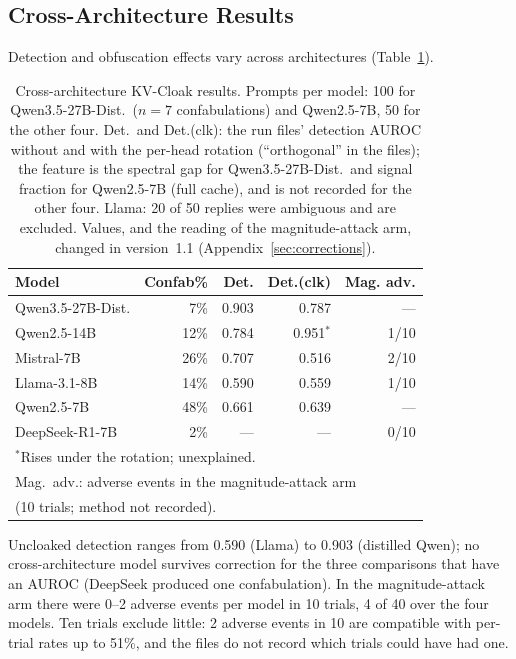 \documentclass[11pt,a4paper]{article}
\begin{document}
\subsection{Cross-Architecture Results}

Detection and obfuscation effects vary across architectures
(Table~\ref{tab:cross_arch}).

\begin{table}[h]
\centering
\caption{Cross-architecture KV-Cloak results. Prompts per model: 100 for Qwen3.5-27B-Dist.\ ($n=7$ confabulations) and Qwen2.5-7B, 50 for the other four. Det.\ and Det.(clk): the run files' detection AUROC without and with the per-head rotation (``orthogonal'' in the files); the feature is the spectral gap for Qwen3.5-27B-Dist.\ and signal fraction for Qwen2.5-7B (full cache), and is not recorded for the other four. Llama: 20 of 50 replies were ambiguous and are excluded. Values, and the reading of the magnitude-attack arm, changed in version~1.1 (Appendix~\ref{sec:corrections}).}
\label{tab:cross_arch}
\begin{tabular}{lrrrr}
\toprule
Model & Confab\% & Det. & Det.(clk) & Mag. adv. \\
\midrule
Qwen3.5-27B-Dist. & 7\% & 0.903 & 0.787 & --- \\
Qwen2.5-14B & 12\% & 0.784 & 0.951$^*$ & 1/10 \\
Mistral-7B & 26\% & 0.707 & 0.516 & 2/10 \\
Llama-3.1-8B & 14\% & 0.590 & 0.559 & 1/10 \\
Qwen2.5-7B & 48\% & 0.661 & 0.639 & --- \\
DeepSeek-R1-7B & 2\% & --- & --- & 0/10 \\
\bottomrule
\multicolumn{5}{l}{\footnotesize $^*$Rises under the rotation; unexplained.} \\
\multicolumn{5}{l}{\footnotesize Mag.\ adv.: adverse events in the magnitude-attack arm} \\
\multicolumn{5}{l}{\footnotesize (10 trials; method not recorded).}
\end{tabular}
\end{table}

Uncloaked detection ranges from 0.590 (Llama) to 0.903 (distilled Qwen);
no cross-architecture model survives correction for the three
comparisons that have an AUROC (DeepSeek produced one confabulation).
In the magnitude-attack arm there were 0--2 adverse events per model in
10 trials, 4 of 40 over the four models. Ten trials exclude little: 2 adverse events
in 10 are compatible with per-trial rates up to 51\%, and the files do not
record which trials could have had one.
\end{document}
